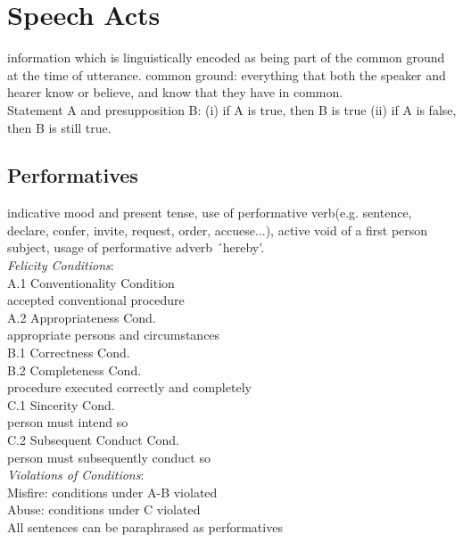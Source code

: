 \section{Speech Acts}
information which is linguistically encoded as being part of the common ground at the time of utterance. {\tiny common ground: everything that both the speaker and hearer know or believe, and know that they have in common.}\\
Statement A and presupposition B: (i) if A is true, then B is true (ii) if A is false, then B is still true.
\subsection*{Performatives}
indicative mood and present tense, use of performative verb(e.g. sentence, declare, confer, invite, request, order, accuese...), active void of a first person subject, usage of performative adverb ´hereby’.\\
\emph{Felicity Conditions}:\\
A.1 Conventionality Condition\\
{\tiny accepted conventional procedure}\\
A.2 Appropriateness Cond.\\
{\tiny appropriate persons and circumstances}\\
B.1 Correctness Cond.\\
B.2 Completeness Cond.\\
{\tiny procedure executed correctly and completely}\\
C.1 Sincerity Cond.\\
{\tiny person must intend so}\\
C.2 Subsequent Conduct Cond.\\
{\tiny person must subsequently conduct so}\\
\emph{Violations of Conditions}:\\
Misfire: conditions under A-B violated\\
Abuse: conditions under C violated\\
All sentences can be paraphrased as performatives
